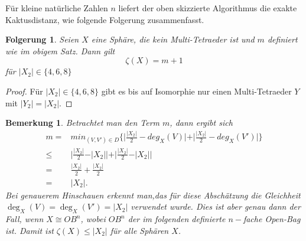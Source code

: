 \documentclass[12pt,titlepage,twoside,cleardoublepage]{article}
\theoremstyle{nummermitklammern}
\newtheorem{folgerung}[temp]{Folgerung}
\newtheorem{bemerkung}[temp]{Bemerkung}
\newtheorem{folgerung}[zahl]{Folgerung}
\newtheorem{bemerkung}[zahl]{Bemerkung}
\numberwithin{equation}{section}
\begin{document}
Für kleine natürliche Zahlen $n$ liefert der oben skizzierte Algorithmus die exakte Kaktusdistanz, wie folgende Folgerung zusammenfasst. 
\begin{folgerung}
Seien $X$ eine Sphäre, die kein Multi-Tetraeder ist und $m$ definiert wie im obigem Satz. Dann gilt 
\[
\zeta(X)= m+1
\]
 für $\vert X_2 \vert \in \{4,6,8\}$ 
\end{folgerung}
\begin{proof}
Für $\vert X_2 \vert \in \{4,6,8\}$ gibt es bis auf Isomorphie nur einen Multi-Tetraeder $Y$ mit $\vert Y_2\vert=\vert X_2\vert.$
\end{proof}
\begin{bemerkung}
Betrachtet man den Term $m$, dann ergibt sich
\begin{align*}
m=&min_{(V,V')\in D}\{\vert\frac{\vert X_2 \vert}{2}-deg_X(V)\vert +\vert \frac{\vert X_2 \vert}{2}-deg_X(V')\vert\}\\
\leq& \vert\frac{\vert X_2 \vert}{2}-\vert X_2\vert\vert +\vert \frac{\vert X_2 \vert}{2}-\vert X_2\vert\vert \\
=&\frac{\vert X_2 \vert}{2}+\frac{\vert X_2 \vert}{2}\\
=&\vert X_2 \vert.
\end{align*}
Bei genauerem Hinschauen erkennt man,das für diese Abschätzung die Gleichheit $\deg_X(V)=\deg_X(V')=\vert X_2 \vert$ verwendet wurde. Dies ist aber genau dann der Fall, wenn $X\cong OB^{n}$, wobei $OB^{n}$ der im folgenden definierte $n-$fache Open-Bag ist. 
Damit ist $\zeta (X)\leq \vert X_2 \vert$ für alle Sphären $X$. 
\end{bemerkung}
\end{document}

